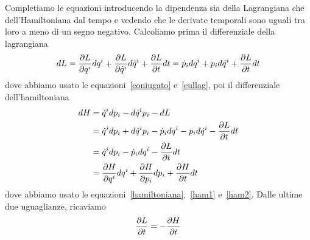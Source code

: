     Completiamo le equazioni introducendo la dipendenza sia della Lagrangiana che dell'Hamiltoniana dal tempo e vedendo che le derivate temporali sono uguali tra loro a meno di un segno negativo. Calcoliamo prima il differenziale della lagrangiana
    \begin{equation*}
        dL = \frac{\partial L}{\partial q^i} dq^i + \frac{\partial L}{\partial\dot q^i} d\dot q^i + \frac{\partial L}{\partial t} dt = \dot p_i dq^i + p_i d\dot q^i + \frac{\partial L}{\partial t} dt 
    \end{equation*}
    dove abbiamo usato le equazioni~\eqref{coniugato} e~\eqref{eullag}, poi il differenziale dell'hamiltoniana
    \begin{equation*}
    \begin{aligned}
        dH & = \dot q^i dp_i - d \dot q^i p_i - dL \\ & = \dot q^i dp_i + d \dot q^i p_i - \dot p_i dq^i - p_i d\dot q^i - \frac{\partial L}{\partial t} dt \\ & = \dot q^i dp_i - \dot p_i dq^i - \frac{\partial L}{\partial t} dt \\ & = \frac{\partial H}{\partial q^i} dq^i + \frac{\partial H}{\partial p_i} dp_i + \frac{\partial H}{\partial t} dt
    \end{aligned}
    \end{equation*}
    dove abbiamo usato le equazioni~\eqref{hamiltoniana},~\eqref{ham1} e~\eqref{ham2}. Dalle ultime due uguaglianze, ricaviamo  
    \begin{equation*}
        \frac{\partial L}{\partial t} = - \frac{\partial H}{\partial t}
    \end{equation*}

\hfill 

